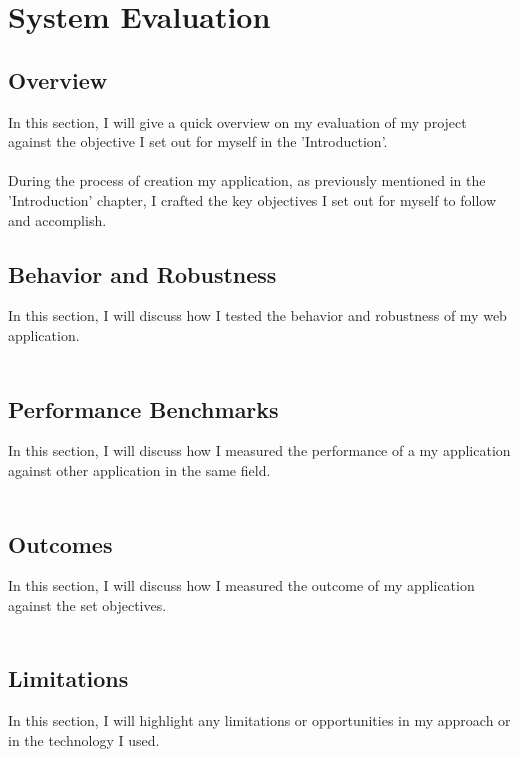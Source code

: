 \chapter{System Evaluation}

\section{Overview}

In this section, I will give a quick overview on my evaluation of my project against the objective I set out for myself in the 'Introduction'.\\ \\
During the process of creation my application, as previously mentioned in the 'Introduction' chapter, I crafted the key objectives I set out for myself to follow and accomplish.

\section{Behavior and Robustness}

In this section, I will discuss how I tested the behavior and robustness of my web application.\\ \\

\section{Performance Benchmarks}

In this section, I will discuss how I measured the performance of a my application against other application in the same field.\\ \\

\section{Outcomes}

In this section, I will discuss how I measured the outcome of my application against the set objectives.\\ \\

\section{Limitations}

In this section, I will highlight any limitations or opportunities in my approach or in the technology I used.\\ \\

